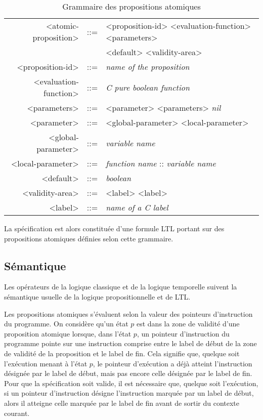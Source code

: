 \begin{table}[h]
\centering
\caption{Grammaire des propositions atomiques}
\label{tab:spe_gram}
\begin{tabular}[]{@{}rcl@{}}
\hline
<atomic-proposition>  & ::= & <proposition-id> <evaluation-function> <parameters>\\
                      &     &  <default> <validity-area>\\
<proposition-id>      & ::= & \emph{name of the proposition}\\
<evaluation-function> & ::= & \emph{C pure boolean function}\\
<parameters>          & ::= & <parameter> <parameters> \textbar{} \emph{nil}\\
<parameter>           & ::= & <global-parameter> \textbar{} <local-parameter>\\
<global-parameter>    & ::= & \emph{variable name}\\
<local-parameter>     & ::= & \emph{function name} :: \emph{variable name}\\
<default>             & ::= & \emph{boolean}\\
<validity-area>       & ::= & <label> <label>\\
<label>               & ::= & \emph{name of a C label}\\
\hline
\end{tabular}
\end{table}

La spécification est alors constituée d'une formule LTL portant sur des
propositions atomiques définies selon cette grammaire.

\subsection{Sémantique}

Les opérateurs de la logique classique et de la logique temporelle
suivent la sémantique usuelle de la logique propositionnelle et de LTL.

Les propositions atomiques s'évaluent selon la valeur des pointeurs
d'instruction du programme. On considère qu'un état \(p\) est dans la zone de
validité d'une proposition atomique lorsque, dans l'état \(p\), un pointeur
d'instruction du programme pointe sur une instruction comprise entre le label de
début de la zone de validité de la proposition et le label de fin. Cela signifie
que, quelque soit l'exécution menant à l'état \(p\), le pointeur d'exécution a
déjà atteint l'instruction désignée par le label de début, mais pas encore celle
désignée par le label de fin. Pour que la spécification soit valide, il est
nécessaire que, quelque soit l'exécution, si un pointeur d'instruction désigne
l'instruction marquée par un label de début, alors il atteigne celle marquée par
le label de fin avant de sortir du contexte courant.

